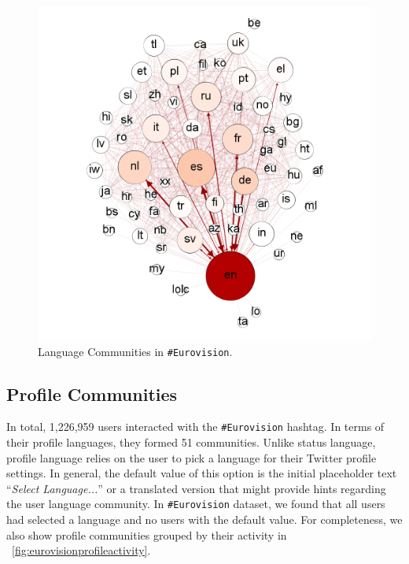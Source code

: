 \documentclass{llncs}
\begin{document}
\begin{figure}[htb]
\centering
\includegraphics[width=\columnwidth]{images/p_s_nselfloop.png}
\caption{Language Communities in {\texttt{\#Eurovision}}.}
\label{fig:eurovisionlangcommunities}
\end{figure}

\subsection{Profile Communities}\label{ppcomm}

In total, 1,226,959 users interacted with the {\texttt{\#Eurovision}}
hashtag. In terms of their profile languages, they formed 51
communities. Unlike status language, profile language relies on the user to pick a
language for their Twitter profile settings. In general, the default
value of this option is the initial placeholder text ``{\emph{Select
Language...}}'' or a translated version that might provide hints
regarding the user language community. In {\texttt{\#Eurovision}}
dataset, we found that all users had selected a language and no users
with the default value.  For completeness, we also show profile
communities grouped by their activity in
~\ref{fig:eurovisionprofileactivity}.
\end{document}
